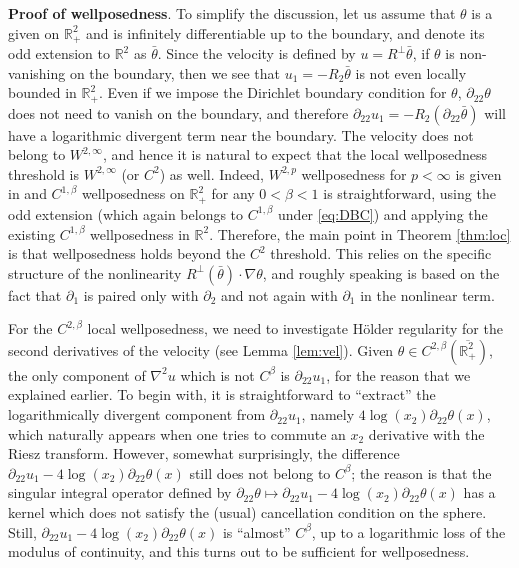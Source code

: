\documentclass[10pt]{amsart}
\theoremstyle{definition}
\theoremstyle{remark}
\numberwithin{equation}{section}
\newcommand{\rd}{\partial}
\newcommand{\nb}{\nabla}
\newcommand{\0}{\emptyset}
\newcommand{\ohp}{\overline{\bbR^2_+}}
\newcommand{\bt}{\beta}
\newcommand{\tht}{\theta}
\newcommand{\bbR}{\mathbb R}
\begin{document}
	\noindent \textbf{Proof of wellposedness}. To simplify the discussion, let us assume that $\tht$ is a given on $\bbR^{2}_{+}$ and is infinitely differentiable up to the boundary, and denote its odd extension to $\bbR^{2}$ as $\bar{\tht}$. Since the velocity is defined by $u = R^{\perp}\bar\tht$, if $\tht$ is non-vanishing on the boundary, then we see that $u_{1} = -R_{2}\bar{\tht}$ is not even locally bounded in $\bbR^{2}_{+}$. Even if we impose the Dirichlet boundary condition for $\tht$, $\rd_{22}\tht$ does not need to vanish on the boundary, and therefore $\rd_{22}u_{1} = -R_{2}(\rd_{22}\bar{\tht})$ will have a logarithmic divergent term near the boundary. The velocity does not belong to $W^{2,\infty}$, and hence it is natural to expect that the local wellposedness threshold is $W^{2,\infty}$ (or $C^{2}$) as well. Indeed, $W^{2,p}$ wellposedness for $p<\infty$ is given in \cite{CNgu} and $C^{1,\bt}$ wellposedness on $\bbR^{2}_{+}$ for any $0<\bt<1$ is straightforward, using the odd extension (which again belongs to $C^{1,\bt}$ under \eqref{eq:DBC}) and applying the existing $C^{1,\bt}$ wellposedness in $\bbR^{2}$. Therefore, the main point in Theorem \ref{thm:loc} is that wellposedness holds beyond the $C^{2}$ threshold. This relies on the specific structure of the nonlinearity $R^\perp(\bar{\tht})\cdot\nb\tht$, and roughly speaking is based on the fact that $\rd_{1}$ is paired only with $\rd_{2}$ and not again with $\rd_{1}$ in the nonlinear term. 
	
	For the $C^{2,\bt}$ local wellposedness, we need to investigate H\"older regularity for the second derivatives of the velocity (see Lemma \ref{lem:vel}). Given $\tht \in C^{2,\bt}(\ohp)$, the only component of $\nb^2 u $ which is not $C^{\bt}$ is $\rd_{22}u_{1}$, for the reason that we explained earlier. To begin with, it is straightforward to ``extract'' the logarithmically divergent component from $\rd_{22}u_{1}$, namely $4\log(x_{2})\rd_{22}\tht(x)$, which naturally appears when one tries to commute an $x_{2}$ derivative with the Riesz transform. However, somewhat surprisingly, the difference $\rd_{22}u_{1} - 4\log(x_{2})\rd_{22}\tht(x)$ still does not belong to $C^{\bt}$; the reason is that the singular integral operator defined by $\rd_{22}\tht \mapsto \rd_{22}u_{1} - 4\log(x_{2})\rd_{22}\tht(x)$ has a kernel which does not satisfy the (usual) cancellation condition on the sphere. Still, $\rd_{22}u_{1} - 4\log(x_{2})\rd_{22}\tht(x)$ is ``almost'' $C^{\bt}$, up to a logarithmic loss of the modulus of continuity, and this turns out to be sufficient for wellposedness.
	
\end{document}
